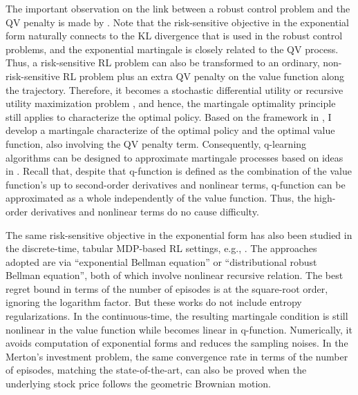 The important observation on the link between a robust control problem and the QV penalty is made by \citet{skiadas2003robust}. Note that the risk-sensitive objective in the exponential form naturally connects to the KL divergence that is used in the robust control problems, and the exponential martingale is closely related to the QV process. Thus, a risk-sensitive RL problem can also be transformed to an ordinary, non-risk-sensitive RL problem plus an extra QV penalty on the value function along the trajectory. Therefore, it becomes a stochastic differential utility or recursive utility maximization problem \citep{duffie1992stochastic}, and hence, the martingale optimality principle still applies to characterize the optimal policy. Based on the framework in \cite{jia2022q}, I develop a martingale characterize of the optimal policy and the optimal value function, also involving the QV penalty term. Consequently, q-learning algorithms can be designed to approximate martingale processes based on ideas in \cite{jia2022policy}. Recall that, despite that q-function is defined as the combination of the value function's up to second-order derivatives and nonlinear terms, q-function can be approximated as a whole independently of the value function. Thus, the high-order derivatives and nonlinear terms do no cause difficulty. 

The same risk-sensitive objective in the exponential form has also been studied in the discrete-time, tabular MDP-based RL settings, e.g., \cite{borkar2002q,fei2020risk,fei2021exponential,wang2023finite}. The approaches adopted are via ``exponential Bellman equation'' or ``distributional robust Bellman equation'', both of which involve nonlinear recursive relation. The best regret bound in terms of the number of episodes is at the square-root order, ignoring the logarithm factor. But these works do not include entropy regularizations. In the continuous-time, the resulting martingale condition is still nonlinear in the value function while becomes linear in q-function. Numerically, it avoids computation of exponential forms and reduces the sampling noises. In the Merton's investment problem, the same convergence rate in terms of the number of episodes, matching the state-of-the-art, can also be proved when the underlying stock price follows the geometric Brownian motion. 

